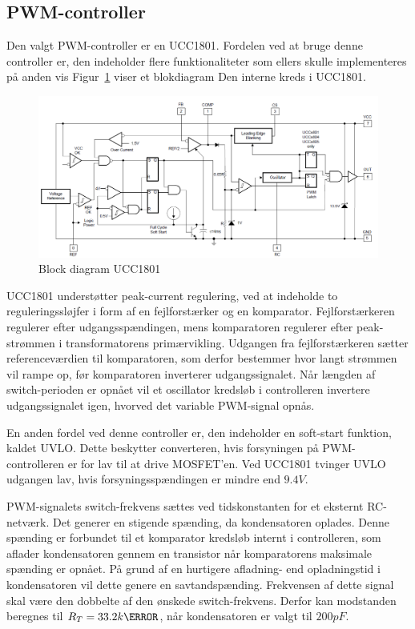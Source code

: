 
\subsection{PWM-controller}
Den valgt PWM-controller er en UCC1801\cite{UCC1801}. Fordelen ved at bruge denne controller er, den indeholder flere funktionaliteter som ellers skulle implementeres på anden vis Figur~\ref{fig:PWM_diagram} viser et blokdiagram Den interne kreds i UCC1801.

\begin{figure}[H]
	\centering
	\includegraphics[width=1\linewidth]{../Dokumentation/tex/2iteration/billeder/PWM_block_diagram.png}
	\caption{Block diagram UCC1801}
	\label{fig:PWM_diagram}
\end{figure}

UCC1801 understøtter peak-current regulering, ved at indeholde to reguleringssløjfer i form af en fejlforstærker og en komparator. Fejlforstærkeren regulerer efter udgangsspændingen, mens komparatoren regulerer efter peak-strømmen i transformatorens primærvikling. Udgangen fra fejlforstærkeren sætter referenceværdien til komparatoren, som derfor bestemmer hvor langt strømmen vil rampe op, før komparatoren inverterer udgangssignalet. Når længden af switch-perioden er opnået vil et oscillator kredsløb i controlleren invertere udgangssignalet igen, hvorved det variable PWM-signal opnås. 

En anden fordel ved denne controller er, den indeholder en soft-start funktion, kaldet UVLO. Dette beskytter converteren, hvis forsyningen på PWM-controlleren er for lav til at drive MOSFET'en. Ved UCC1801 tvinger UVLO udgangen lav, hvis forsyningsspændingen er mindre end $9.4V$.

PWM-signalets switch-frekvens sættes ved tidskonstanten for et eksternt RC-netværk. Det generer en stigende spænding, da kondensatoren oplades. Denne spænding er forbundet til et komparator kredsløb internt i controlleren, som aflader kondensatoren gennem en transistor når komparatorens maksimale spænding er opnået. På grund af en hurtigere afladning- end opladningstid i kondensatoren vil dette genere en savtandspænding. Frekvensen af dette signal skal være den dobbelte af den ønskede switch-frekvens. Derfor kan modstanden beregnes til $R_T = 33.2k\ohm$, når kondensatoren er valgt til $200pF$.

